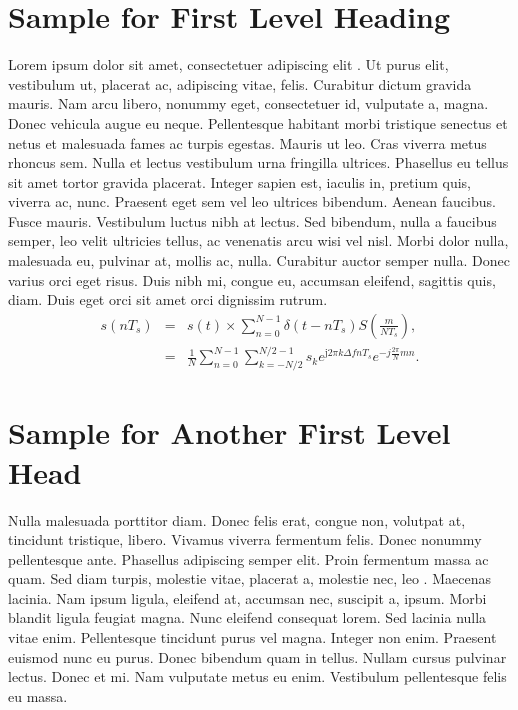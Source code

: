 \documentclass{wber}
\begin{document}
\maketitle



\section{Sample for First Level Heading}\label{sec1}

Lorem ipsum dolor sit amet, consectetuer adipiscing elit \citep{howells-51,chicago-82}. Ut purus elit, vestibulum ut, placerat ac, adipiscing vitae,
felis. Curabitur dictum gravida mauris. Nam arcu libero, nonummy eget, consectetuer id, vulputate a, magna. Donec
vehicula augue eu neque. Pellentesque habitant morbi tristique senectus et netus et malesuada fames ac turpis egestas.
Mauris ut leo. Cras viverra metus rhoncus sem. Nulla et lectus vestibulum urna fringilla ultrices. Phasellus eu tellus
sit amet tortor gravida placerat. Integer sapien est, iaculis in, pretium quis, viverra ac, nunc. Praesent eget sem vel
leo ultrices bibendum. Aenean faucibus. Fusce mauris. Vestibulum luctus nibh at lectus. Sed bibendum, nulla a faucibus semper, leo velit ultricies tellus, ac
venenatis arcu wisi vel nisl. Morbi dolor nulla, malesuada eu, pulvinar at, mollis ac, nulla. Curabitur
auctor semper nulla. Donec varius orci eget risus. Duis nibh mi, congue eu, accumsan eleifend, sagittis quis, diam.
Duis eget orci sit amet orci dignissim rutrum.\vspace*{-5pt}
\begin{eqnarray}
s(nT_{s}) &= &s(t)\times \sum\limits_{n=0}^{N-1} \delta (t-nT_{s})   S \left(\frac{m}{NT_{s}}\right), \nonumber\\
&= &\frac{1}{N} \sum\limits_{n=0}^{N-1} \sum\limits_{k=-N/2}^{N/2-1} s_{k} e^{\mathrm{j}2\pi k\Delta fnT_{s}} e^{-j\frac{2\pi}{N}mn}.
\end{eqnarray}

\section{Sample for Another First Level Head}\label{sec2}

Nulla malesuada porttitor diam. Donec felis erat, congue non, volutpat at, tincidunt tristique, libero. Vivamus viverra
fermentum felis. Donec nonummy pellentesque ante. Phasellus adipiscing semper elit. Proin fermentum massa ac
quam. Sed diam turpis, molestie vitae, placerat a, molestie nec, leo \citep{chicago-82}. Maecenas lacinia. Nam ipsum ligula, eleifend
at, accumsan nec, suscipit a, ipsum. Morbi blandit ligula feugiat magna. Nunc eleifend consequat lorem. Sed lacinia
nulla vitae enim. Pellentesque tincidunt purus vel magna. Integer non enim. Praesent euismod nunc eu purus. Donec
bibendum quam in tellus. Nullam cursus pulvinar lectus. Donec et mi. Nam vulputate metus eu enim. Vestibulum
pellentesque felis eu massa.
\end{document}

